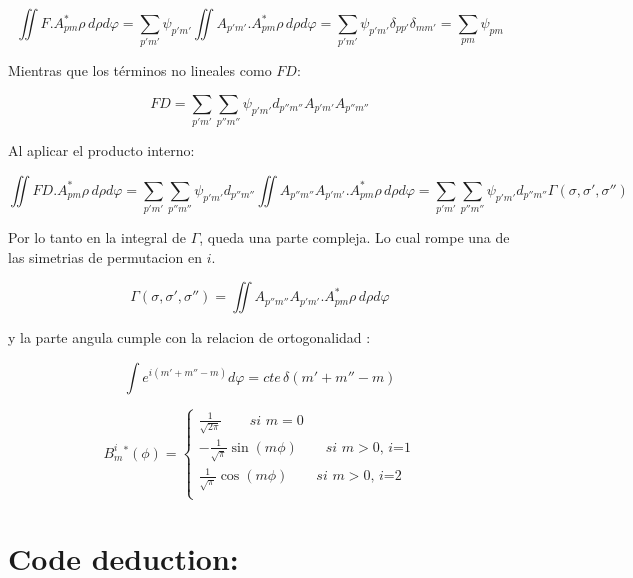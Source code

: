 		\begin{equation}
			\iint F.A^*_{pm}\rho \, d\!\rho d\!\varphi=\sum_{p'm'} \psi_{p'm'} \iint A_{p'm'}.A^*_{pm}\rho \, d\!\rho d\!\varphi =\sum_{p'm'} \psi_{p'm'} \delta_{pp'}\delta_{mm'}=\sum_{pm} \psi_{pm}
		\end{equation}
		
		Mientras que los términos no lineales como $FD$:
		
		\begin{equation}
			FD=\sum_{p'm'}\sum_{p''m''}\psi_{p'm'}d_{p''m''}A_{p'm'}A_{p''m''}%
		\end{equation}
	
		Al aplicar el producto interno:
		
		\begin{equation}
			\iint FD.A^*_{pm}\rho \, d\!\rho d\!\varphi=\sum_{p'm'}\sum_{p''m''}\psi_{p'm'}d_{p''m''} \iint A_{p''m''} A_{p'm'}.A^*_{pm}\rho \, d\!\rho d\!\varphi=\sum_{p'm'}\sum_{p''m''}\psi_{p'm'}d_{p''m''}\Gamma (\sigma, \sigma', \sigma'')
		\end{equation}
		
		Por lo tanto en la integral de $\Gamma$, queda una parte compleja. Lo cual rompe una de las simetrias de permutacion en $i$.

		\begin{equation}
		\Gamma (\sigma, \sigma', \sigma'')= \iint A_{p''m''} A_{p'm'}.A^*_{pm}\rho \, d\!\rho d\!\varphi
		\end{equation}

	y la parte angula cumple con la relacion de ortogonalidad :
	
	\begin{equation}
		\int e^{i(m'+m''-m)}d\!\varphi=cte\, \delta(m'+m''-m)
	\end{equation}

	\[B^i_m^*(\phi)=
	\begin{cases}
	\frac{1}{\sqrt{2\pi}} \qquad \textit{si $m=0$} \\
	-\frac{1}{\sqrt{\pi}}\sin(m\phi) \qquad \textit{si $m>0$, i=1}\\
	\frac{1}{\sqrt{\pi}}\cos(m\phi) \qquad \textit{si $m>0$, i=2} \\
	\end{cases}
	\]

	\section{Code deduction:}
	
